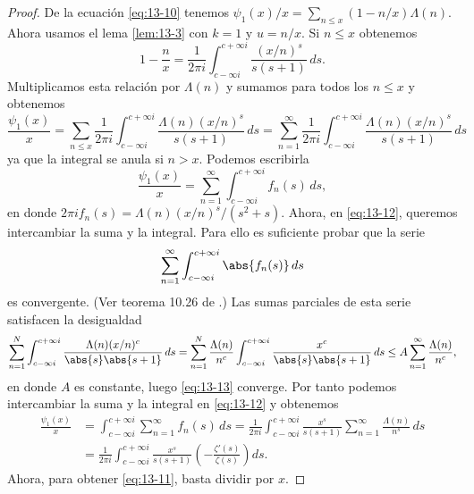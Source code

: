 \documentclass[12pt,a4paper]{book}
\begin{document}
    \begin{proof}
        De la ecuación \eqref{eq:13-10} tenemos $\psi_{1}(x)/x=\sum_{n\leq x}(1-n/x)\Lambda(n)$.
        Ahora usamos el lema \ref{lem:13-3} con $k=1$ y $u=n/x$. Si $n\leq x$ obtenemos
        \begin{equation*}
            1-\frac{n}{x}=\frac{1}{2\pi i}\int_{c-\infty i}^{c+\infty i}\frac{(x/n)^{s}}{s(s+1)}\,ds.
        \end{equation*}
        Multiplicamos esta relación por $\Lambda(n)$ y sumamos para todos los $n\leq x$ y
        obtenemos
        \begin{equation*}
            \frac{\psi_{1}(x)}{x}=\sum_{n\leq x}\frac{1}{2\pi i}\int_{c-\infty i}^{c+\infty i}\frac{\Lambda(n)(x/n)^{s}}{s(s+1)}\,ds=\sum_{n=1}^{\infty}\frac{1}{2\pi i}\int_{c-\infty i}^{c+\infty i}\frac{\Lambda(n)(x/n)^{s}}{s(s+1)}\,ds
        \end{equation*}
        ya que la integral se anula si $n>x$. Podemos escribirla
        \begin{equation}\label{eq:13-12}
            \frac{\psi_{1}(x)}{x}=\sum_{n=1}^{\infty}\int_{c-\infty i}^{c+\infty i}f_{n}(s)\,ds,
        \end{equation}
        en donde $2\pi if_{n}(s)=\Lambda(n)(x/n)^{s}/(s^{2}+s)$. Ahora, en \eqref{eq:13-12}, queremos
        intercambiar la suma y la integral. Para ello es suficiente probar que la serie
        \begin{equation}\label{eq:13-13}
            \sum_{n=1}^{\infty}\int_{c-\infty i}^{c+\infty i}\abs{f_{n}(s)}\,ds
        \end{equation}
        es convergente. (Ver teorema 10.26 de \cite{apostol1976}.) Las sumas parciales de esta
        serie satisfacen la desigualdad
        \begin{equation*}
            \sum_{n=1}^{N}\int_{c-\infty i}^{c+\infty i}\frac{\Lambda(n)(x/n)^{c}}{\abs{s}\abs{s+1}}\,ds=\sum_{n=1}^{N}\frac{\Lambda(n)}{n^{c}}\int_{c-\infty i}^{c+\infty i}\frac{x^{c}}{\abs{s}\abs{s+1}}\,ds\leq A\sum_{n=1}^{\infty}\frac{\Lambda(n)}{n^{c}},
        \end{equation*}
        en donde $A$ es constante, luego \eqref{eq:13-13} converge. Por tanto podemos
        intercambiar la suma y la integral en \eqref{eq:13-12} y obtenemos
        \begin{align*}
            \frac{\psi_{1}(x)}{x}&=\int_{c-\infty i}^{c+\infty i}\sum_{n=1}^{\infty}f_{n}(s)\,ds=\frac{1}{2\pi i}\int_{c-\infty i}^{c+\infty i}\frac{x^{s}}{s(s+1)}\sum_{n=1}^{\infty}\frac{\Lambda(n)}{n^{s}}\,ds\\
            &=\frac{1}{2\pi i}\int_{c-\infty i}^{c+\infty i}\frac{x^{s}}{s(s+1)}\left(-\frac{\zeta'(s)}{\zeta(s)}\right)ds.
        \end{align*}
        Ahora, para obtener \eqref{eq:13-11}, basta dividir por $x$.
    \end{proof}
\end{document}
